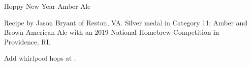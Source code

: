 \stylesection{\styleamericanamberale}

\begin{recipe}{Hoppy New Year Amber Ale}

\begin{aboutblock}
Recipe by Jason Bryant of Reston, VA. Silver medal in Category 11: Amber and
Brown American Ale with an 2019 National Homebrew Competition in Providence,
RI. \sourceaha
\end{aboutblock}


\begin{methodandtiming}
 
\begin{mashsteps}
\end{mashsteps}

\begin{fermentationsteps}
\end{fermentationsteps}

\begin{directions}
Add whirlpool hops at .
\end{directions}

\end{methodandtiming}

\recipebreak

\begin{ingredientsblock}

\begin{malts}
\end{malts}

\begin{hops}
\end{hops}


\end{ingredientsblock}

\end{recipe}


